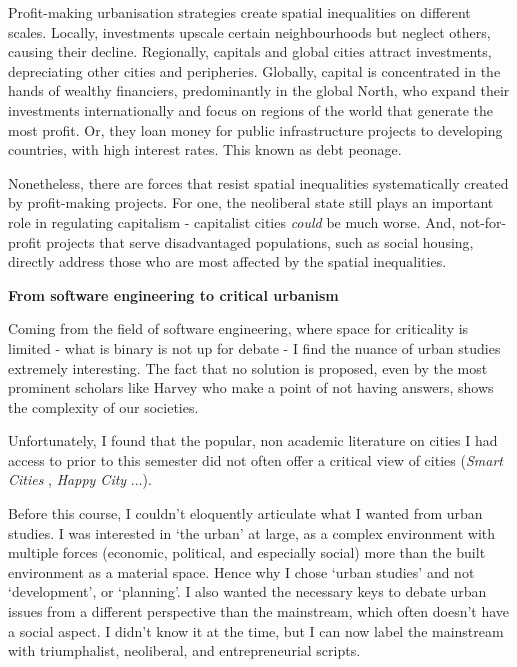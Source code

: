 \documentclass[12pt]{article}
\begin{document}
Profit-making urbanisation strategies create spatial inequalities on different scales. Locally, investments upscale certain neighbourhoods but neglect others, causing their decline. Regionally, capitals and global cities attract investments, depreciating other cities and peripheries. Globally, capital is concentrated in the hands of wealthy financiers, predominantly in the global North, who expand their investments internationally and focus on regions of the world that generate the most profit. Or, they loan money for public infrastructure projects to developing countries, with high interest rates. This known as debt peonage. 

Nonetheless, there are forces that resist spatial inequalities systematically created by profit-making projects. For one, the neoliberal state still plays an important role in regulating capitalism - capitalist cities \textit{could} be much worse. And, not-for-profit projects that serve disadvantaged populations, such as social housing, directly address those who are most affected by the spatial inequalities.

\pagebreak

\textbf{From software engineering to critical urbanism}

Coming from the field of software engineering, where space for criticality is limited - what is binary is not up for debate - I find the nuance of urban studies extremely interesting. The fact that no solution is proposed, even by the most prominent scholars like Harvey who make a point of not having answers, shows the complexity of our societies. 

Unfortunately, I found that the popular, non academic literature on cities I had access to prior to this semester did not often offer a critical view of cities (\textit{Smart Cities} \parencite{townsend2013smart}, \textit{Happy City} \parencite{montgomery2013happy}...). 

Before this course, I couldn’t eloquently articulate what I wanted from urban studies. I was interested in `the urban’ at large, as a complex environment with multiple forces (economic, political, and especially social) more than the built environment as a material space. Hence why I chose ‘urban studies’ and not ‘development’, or ‘planning’.
I also wanted the necessary keys to debate urban issues from a different perspective than the mainstream, which often doesn’t have a social aspect. I didn’t know it at the time, but I can now label the mainstream with triumphalist, neoliberal, and entrepreneurial scripts.
\end{document}
